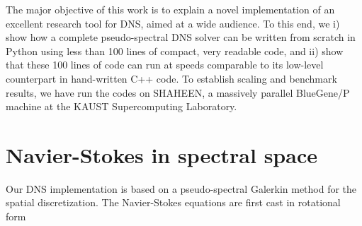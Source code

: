 \documentclass[11pt, oneside]{article}
\begin{document}
The major objective of this work is to explain a novel implementation of an excellent research tool for DNS, aimed at a wide audience. To this end, we i) show how a complete pseudo-spectral DNS solver can be written from scratch in Python using less than 100 lines of compact, very readable code, and ii) show that these 100 lines of code can run at speeds comparable to its low-level counterpart in hand-written C++ code. To establish scaling and benchmark results, we have run the codes on SHAHEEN, a massively parallel BlueGene/P machine at the KAUST Supercomputing Laboratory.

\section{Navier-Stokes in spectral space}
Our DNS implementation is based on a pseudo-spectral Galerkin method \cite{canuto1987} for the spatial discretization. The Navier-Stokes equations are first cast in rotational form
\end{document}
